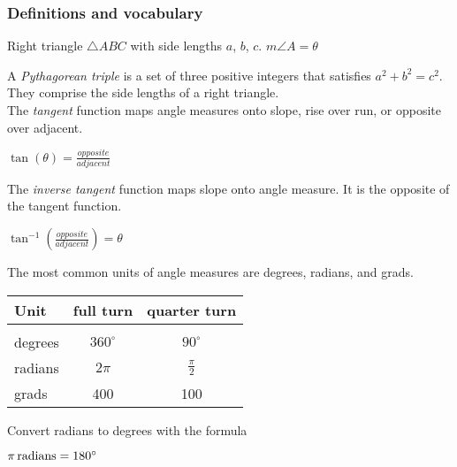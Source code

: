\documentclass[12pt, twoside]{article}
\begin{document}
\begin{enumerate}
\newpage
\subsubsection*{Definitions and vocabulary}
Right triangle $\triangle ABC$ with side lengths $a$, $b$, $c$. $m\angle A = \theta$
  \begin{center}
  \end{center}

A \emph{Pythagorean triple} is a set of three positive integers that 
satisfies $a^2+b^2=c^2$. They comprise the side lengths of a right triangle.\\[1cm]
The \emph{tangent} function maps angle measures onto slope, rise over run, or opposite over adjacent.
\begin{center}
$\displaystyle \tan(\theta)=\frac{opposite}{adjacent}$
\end{center}
The \emph{inverse tangent} function maps slope onto angle measure. It is the opposite of the tangent function.
\begin{center}
$\displaystyle \tan^{-1}\left(\frac{opposite}{adjacent}\right)=\theta$
\end{center}
The most common units of angle measures are degrees, radians, and grads.\begin{center}
\begin{tabular}{lcc}
  Unit & full turn & quarter turn\\[0.1cm]
  \hline\\
  degrees & $360^\circ$ & $90^\circ$\\[0.25cm]
  radians & $2\pi$ & $\displaystyle \frac{\pi}{2}$\\[0.35cm]
  grads & 400 & 100
\end{tabular}
\end{center}
Convert radians to degrees with the formula
\begin{center}
 $\pi \, \rm{radians}=180^\circ$
\end{center}

\end{enumerate}
\end{document}
